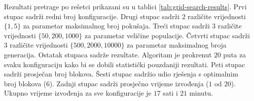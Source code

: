 \documentclass[times, utf8, diplomski]{fer}
\begin{document}
Rezultati pretrage po rešetci prikazani su u tablici \ref{tab:grid-search-results}. Prvi stupac sadrži redni broj konfiguracije. Drugi stupac sadrži $2$ različite vrijednosti $\{1, 5\}$ za parametar maksimalnog broj pokušaja. Treći stupac sadrži $3$ različite vrijednosti $\{50, 200, 1000\}$ za parametar veličine populacije. Četvrti stupac sadrži $3$ različite vrijednosti $\{500, 2000, 10000\}$ za parametar maksimalnog broja generacija. Ostatak stupaca sadrže rezultate. Algoritam je prokrenut $20$ puta za svaku konfiguraciju kako bi se dobili statistički pouzdaniji rezultati. Peti stupac sadrži prosječan broj blokova. Šesti stupac sadržio udio rješenja s optimalnim broj blokova ($6$). Zadnji stupac sadrži prosječno vrijeme izvođenja ($1$ od $20$). Ukupno vrijeme izvođenja za sve konfiguracije je $17$ sati i $21$ minutu.
\end{document}
